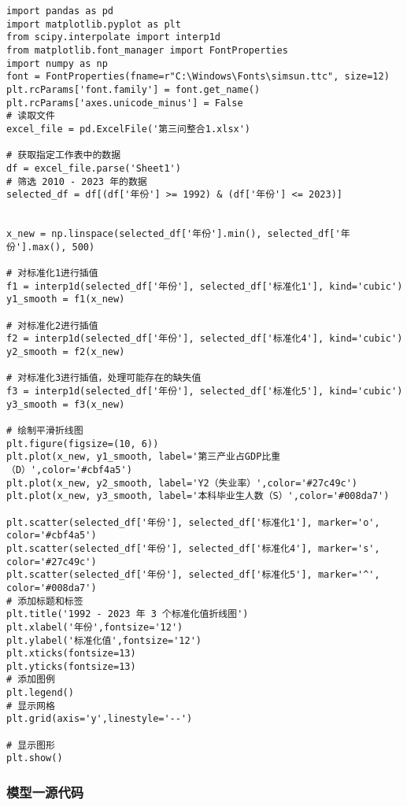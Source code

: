 \documentclass[withoutpreface,bwprint]{cumcmthesis} %
\begin{document}
\begin{verbatim}
import pandas as pd
import matplotlib.pyplot as plt
from scipy.interpolate import interp1d
from matplotlib.font_manager import FontProperties
import numpy as np
font = FontProperties(fname=r"C:\Windows\Fonts\simsun.ttc", size=12)
plt.rcParams['font.family'] = font.get_name()
plt.rcParams['axes.unicode_minus'] = False
# 读取文件
excel_file = pd.ExcelFile('第三问整合1.xlsx')

# 获取指定工作表中的数据
df = excel_file.parse('Sheet1')
# 筛选 2010 - 2023 年的数据
selected_df = df[(df['年份'] >= 1992) & (df['年份'] <= 2023)]


x_new = np.linspace(selected_df['年份'].min(), selected_df['年份'].max(), 500)

# 对标准化1进行插值
f1 = interp1d(selected_df['年份'], selected_df['标准化1'], kind='cubic')
y1_smooth = f1(x_new)

# 对标准化2进行插值
f2 = interp1d(selected_df['年份'], selected_df['标准化4'], kind='cubic')
y2_smooth = f2(x_new)

# 对标准化3进行插值，处理可能存在的缺失值
f3 = interp1d(selected_df['年份'], selected_df['标准化5'], kind='cubic')
y3_smooth = f3(x_new)

# 绘制平滑折线图
plt.figure(figsize=(10, 6))
plt.plot(x_new, y1_smooth, label='第三产业占GDP比重（D）',color='#cbf4a5')
plt.plot(x_new, y2_smooth, label='Y2（失业率）',color='#27c49c')
plt.plot(x_new, y3_smooth, label='本科毕业生人数（S）',color='#008da7')

plt.scatter(selected_df['年份'], selected_df['标准化1'], marker='o', color='#cbf4a5')
plt.scatter(selected_df['年份'], selected_df['标准化4'], marker='s', color='#27c49c')
plt.scatter(selected_df['年份'], selected_df['标准化5'], marker='^', color='#008da7')
# 添加标题和标签
plt.title('1992 - 2023 年 3 个标准化值折线图')
plt.xlabel('年份',fontsize='12')
plt.ylabel('标准化值',fontsize='12')
plt.xticks(fontsize=13)
plt.yticks(fontsize=13)
# 添加图例
plt.legend()
# 显示网格
plt.grid(axis='y',linestyle='--')

# 显示图形
plt.show()
\end{verbatim}

\subsubsection{模型一源代码}
\end{document}
